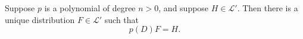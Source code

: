 Suppose $p$ is a polynomial of degree $n > 0$, and suppose $H \in \mathcal{L}'$. Then there is a unique distribution $F \in \mathcal{L}'$ such that
$$p(D)F = H.$$
